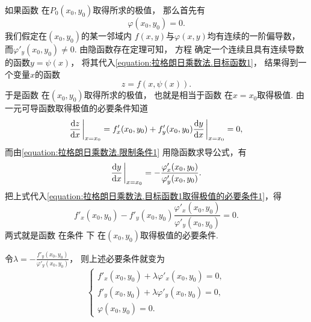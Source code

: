 如果函数 
在\(P_0(x_0,y_0)\)取得所求的极值，
那么首先有
\begin{equation}\label{equation:拉格朗日乘数法.限制条件1在P0}
	\varphi(x_0,y_0)=0.
\end{equation}
我们假定在\((x_0,y_0)\)的某一邻域内
\(f(x,y)\)与\(\varphi(x,y)\)均有连续的一阶偏导数，
而\(\varphi'_y(x_0,y_0)\neq0\).
由隐函数存在定理可知，
方程 
确定一个连续且具有连续导数的函数\(y=\psi(x)\)，
将其代入\cref{equation:拉格朗日乘数法.目标函数1}，
结果得到一个变量\(x\)的函数
\begin{equation}\label{equation:拉格朗日乘数法.目标函数1.代入限制条件1}
	z=f(x,\psi(x)).
\end{equation}
于是函数  在\((x_0,y_0)\)取得所求的极值，
也就是相当于函数  在\(x=x_0\)取得极值.
由一元可导函数取得极值的必要条件知道
\begin{equation}\label{equation:拉格朗日乘数法.目标函数1取得极值的必要条件1}
	\dv{z}{x}\eval_{x=x_0}
	= f'_x(x_0,y_0) + f'_y(x_0,y_0) \dv{y}{x}\eval_{x=x_0}
	= 0,
\end{equation}
而由\cref{equation:拉格朗日乘数法.限制条件1} 用隐函数求导公式，有\[
	\dv{y}{x}\eval_{x=x_0}
	= -\frac{\varphi'_x(x_0,y_0)}{\varphi'_y(x_0,y_0)}.
\]
把上式代入\cref{equation:拉格朗日乘数法.目标函数1取得极值的必要条件1}，得
\begin{equation}\label{equation:拉格朗日乘数法.目标函数1取得极值的必要条件2}
	f'_x(x_0,y_0) - f'_y(x_0,y_0) \frac{\varphi'_x(x_0,y_0)}{\varphi'_y(x_0,y_0)}
	= 0.
\end{equation}
两式就是函数 
在条件  下
在\((x_0,y_0)\)取得极值的必要条件.

令\(\lambda=-\frac{f'_y(x_0,y_0)}{\varphi'_y(x_0,y_0)}\)，
则上述必要条件就变为
\begin{equation}\label{equation:拉格朗日乘数法.目标函数1取得极值的必要条件3}
	\left\{ \begin{array}{l}
		f'_x(x_0,y_0) + \lambda \varphi'_x(x_0,y_0) = 0, \\
		f'_y(x_0,y_0) + \lambda \varphi'_y(x_0,y_0) = 0, \\
		\varphi(x_0,y_0) = 0.
	\end{array} \right.
\end{equation}

